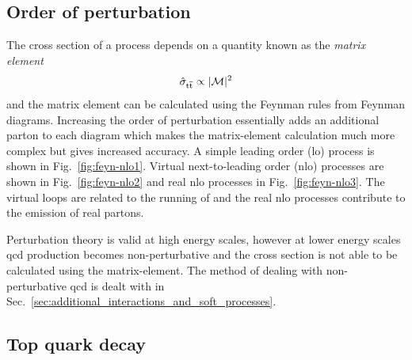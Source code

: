 \subsection{Order of perturbation} %
\label{sub:order_of_perturbation}

The cross section of a process depends on a quantity known as the \textit{matrix element}
\begin{equation*}
	\hat{\sigma}_{\mathrm{t}\overline{\mathrm{t}}{}}\propto\lvert \mathcal{M} \rvert^2
\end{equation*}
and the matrix element can be calculated using the Feynman rules from Feynman diagrams.
Increasing the order of perturbation essentially adds an additional parton to each diagram which makes the matrix-element calculation much more complex but gives increased accuracy.
A simple leading order (\acrshort{lo}) process is shown in Fig.~\ref{fig:feyn-nlo1}.
Virtual next-to-leading order (\acrshort{nlo}) processes are shown in Fig.~\ref{fig:feyn-nlo2} and real \acrshort{nlo} processes in Fig.~\ref{fig:feyn-nlo3}.
The virtual loops are related to the running of \alpS{} and the real \acrshort{nlo} processes contribute to the emission of real partons.


Perturbation theory is valid at high energy scales, however at lower energy scales \acrshort{qcd} production becomes non-perturbative and the cross section is not able to be calculated using the matrix-element.
The method of dealing with non-perturbative \acrshort{qcd} is dealt with in Sec.~\ref{sec:additional_interactions_and_soft_processes}.




\subsection{Top quark decay} %
\label{sub:top_quark_decay}

